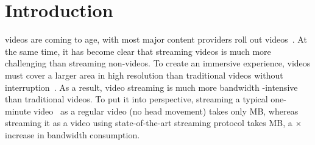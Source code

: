 
\section{Introduction}



\vr videos are coming to age, with most major content providers roll out \vr videos~\cite{??,??,??,??,??}.
At the same time, it has become clear that streaming \vr videos is much more challenging than streaming non-\vr videos.
To create an immersive experience, \vr videos must cover a larger area in high resolution than traditional videos without interruption~\cite{??}. 
As a result, \vr video streaming is much more bandwidth -intensive than traditional videos.
To put it into perspective, streaming a typical one-minute \vr video~\cite{give the url} as a regular video (\ie no head movement) takes only \fillme MB, whereas streaming it as a \vr video using state-of-the-art \vr streaming protocol takes \fillme MB, a \fillme$\times$ increase in bandwidth consumption.

